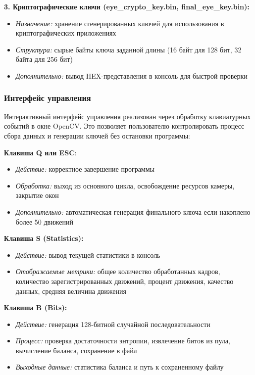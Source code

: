 \documentclass[14pt, a4paper]{extreport}
\begin{document}
\textbf{3. Криптографические ключи (eye\_crypto\_key.bin, final\_eye\_key.bin):}
\begin{itemize}
    \item \textit{Назначение:} хранение сгенерированных ключей для использования в криптографических приложениях
    \item \textit{Структура:} сырые байты ключа заданной длины (16 байт для 128 бит, 32 байта для 256 бит)
    \item \textit{Дополнительно:} вывод HEX-представления в консоль для быстрой проверки
\end{itemize}


\subsubsection{Интерфейс управления}

Интерактивный интерфейс управления реализован через обработку клавиатурных событий в окне OpenCV. Это позволяет пользователю контролировать процесс сбора данных и генерации ключей без остановки программы:

\textbf{Клавиша Q или ESC}: 
\begin{itemize}
    \item \textit{Действие:} корректное завершение программы
    \item \textit{Обработка:} выход из основного цикла, освобождение ресурсов камеры, закрытие окон
    \item \textit{Дополнительно:} автоматическая генерация финального ключа если накоплено более 50 движений
\end{itemize}

\textbf{Клавиша S (Statistics):}
\begin{itemize}
    \item \textit{Действие:} вывод текущей статистики в консоль
    \item \textit{Отображаемые метрики:} общее количество обработанных кадров, количество зарегистрированных движений, процент движения, качество данных, средняя величина движения
\end{itemize}

\textbf{Клавиша B (Bits):}
\begin{itemize}
    \item \textit{Действие:} генерация 128-битной случайной последовательности
    \item \textit{Процесс:} проверка достаточности энтропии, извлечение битов из пула, вычисление баланса, сохранение в файл
    \item \textit{Выходные данные:} статистика баланса и путь к сохраненному файлу
\end{itemize}
\end{document}
